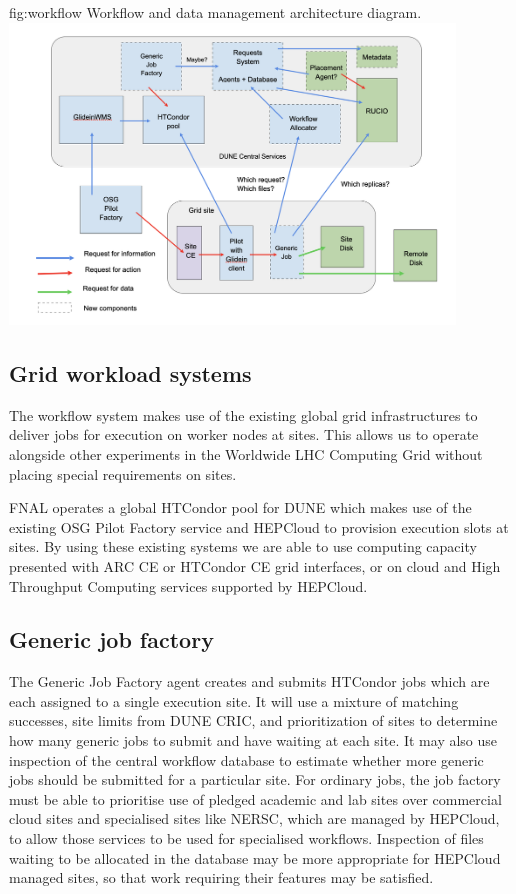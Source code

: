 \documentclass[../main-v1.tex]{subfiles}
\begin{document}
\begin{dunefigure}
{fig:workflow} 
{Workflow and data management architecture diagram.}
\includegraphics[height=8cm]{graphics/Workflow/wfs.png}
\end{dunefigure}

\subsection{Grid workload systems}
\label{sec:flow:grid}

The workflow system makes use of the existing global grid infrastructures to deliver jobs for execution on worker nodes at sites. This allows us to operate alongside other experiments in the Worldwide LHC Computing Grid without placing special requirements on sites.

FNAL operates a global HTCondor pool for DUNE which makes use of the existing OSG Pilot Factory service and HEPCloud to provision execution slots at sites. By using these existing systems we are able to use computing capacity presented with ARC CE or HTCondor CE grid interfaces, or on cloud and High Throughput Computing services supported by HEPCloud.

\subsection{Generic job factory }
\label{sec:flow:factory}

The Generic Job Factory agent creates and submits HTCondor jobs which are each assigned to a single execution site. It will use a mixture of matching successes, site limits from DUNE CRIC, and prioritization of sites to determine how many generic jobs to submit and have waiting at each site. It may also use inspection of the central workflow database to estimate whether more generic jobs should be submitted for a particular site. For ordinary jobs, the job factory must be able to prioritise use of pledged academic and lab sites over commercial cloud sites and specialised sites like NERSC, which are managed by HEPCloud, to allow those services to be used for specialised workflows. Inspection of files waiting to be allocated in the database may be more appropriate for HEPCloud managed sites, so that work requiring their features may be satisfied.
\end{document}
